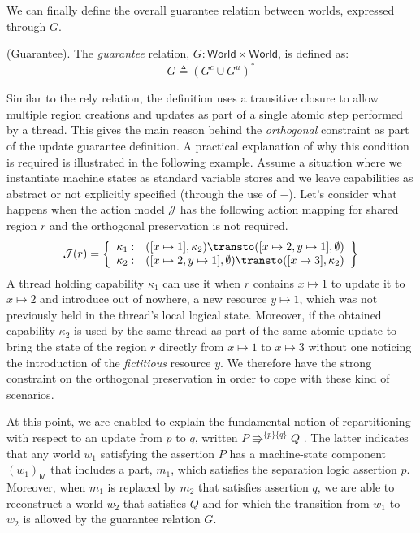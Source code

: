 We can finally define the overall guarantee relation between worlds, expressed through $G$.
\begin{defn}
	(Guarantee).
	The \emph{guarantee} relation, $G : \mathsf{World} \times \mathsf{World}$, is defined as:
	\[
		G \triangleq (G^c \cup G^u)^*
	\]
\end{defn}
Similar to the rely relation, the definition uses a transitive closure to allow multiple region creations and updates as part of a single atomic step performed by a thread. This gives the main reason behind the \textit{orthogonal} constraint as part of the update guarantee definition. A practical explanation of why this condition is required is illustrated in the following example. Assume a situation where we instantiate machine states as standard variable stores and we leave capabilities as abstract or not explicitly specified (through the use of $-$). Let's consider what happens when the action model $\mathcal{J}$ has the following action mapping for shared region $r$ and the orthogonal preservation is not required.
\[
	\mathcal{J}(r)
		=
	\left\{
		\begin{array}{r r}
			\kappa_1: & ([x \mapsto 1], \kappa_2) \transto ([x \mapsto 2, y \mapsto 1], \emptyset) \\
			\kappa_2: & ([x \mapsto 2, y \mapsto 1], \emptyset) \transto ([x \mapsto 3], \kappa_2)
		\end{array}
	\right\}
\]
A thread holding capability $\kappa_1$ can use it when $r$ contains $x \mapsto 1$ to update it to $x \mapsto 2$ and introduce out of nowhere, a new resource $y \mapsto 1$, which was not previously held in the thread's local logical state. Moreover, if the obtained capability $\kappa_2$ is used by the same thread as part of the same atomic update to bring the state of the region $r$ directly from $x \mapsto 1$ to $x \mapsto 3$ without one noticing the introduction of the \textit{fictitious} resource $y$. We therefore have the strong constraint on the orthogonal preservation in order to cope with these kind of scenarios.

At this point, we are enabled to explain the fundamental notion of repartitioning with respect to an update from $p$ to $q$, written $P \Rrightarrow^{\{p\}\{q\}} Q$ \cite{cap}. The latter indicates that any world $w_1$ satisfying the assertion $P$ has a machine-state component $(w_1)_\mathsf{M}$ that includes a part, $m_1$, which satisfies the separation logic assertion $p$. Moreover, when $m_1$ is replaced by $m_2$ that satisfies assertion $q$, we are able to reconstruct a world $w_2$ that satisfies $Q$ and for which the transition from $w_1$ to $w_2$ is allowed by the guarantee relation $G$.

